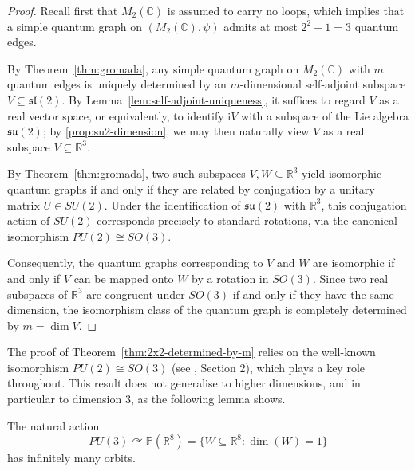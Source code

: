 \begin{proof}
    \label{prf:1x2-determined-by-m}
    Recall first that \( M_2(\mathbb{C}) \) is assumed to carry
    no loops, which implies that a simple quantum graph on
    \( (M_2(\mathbb{C}), \psi) \) admits at most \( 2^2 - 1 = 3 \)
    quantum edges.

    By Theorem~\ref{thm:gromada}, any simple quantum graph on
    \( M_2(\mathbb{C}) \) with \( m \) quantum edges is uniquely
    determined by an \( m \)-dimensional self-adjoint subspace
    \( V \subseteq \mathfrak{sl}(2) \). By
    Lemma~\ref{lem:self-adjoint-uniqueness}, it suffices to regard
    \( V \) as a real vector space, or equivalently, to identify
    \( \mathrm{i} V \) with a subspace of the Lie algebra
    \( \mathfrak{su}(2) \); by \ref{prop:su2-dimension}, we may then
    naturally view \( V \) as a real
    subspace \( V \subseteq \mathbb{R}^3 \).

    By Theorem~\ref{thm:gromada}, two such subspaces
    \( V, W \subseteq \mathbb{R}^3 \) yield isomorphic quantum graphs if
    and only if they are related by conjugation by a unitary matrix
    \( U \in SU(2) \). Under the identification of
    \( \mathfrak{su}(2) \) with \( \mathbb{R}^3 \), this conjugation
    action of \( SU(2) \) corresponds precisely to standard rotations,
    via the canonical isomorphism \( PU(2) \cong SO(3) \).

    Consequently, the quantum graphs corresponding to \( V \) and
    \( W \) are isomorphic if and only if \( V \) can be mapped onto
    \( W \) by a rotation in \( SO(3) \). Since two real subspaces of
    \( \mathbb{R}^3 \) are congruent under \( SO(3) \) if and only if
    they have the same dimension, the isomorphism class of the
    quantum graph is completely determined by \( m = \dim V \).
\end{proof}

The proof of Theorem~\ref{thm:2x2-determined-by-m} relies on the
well-known isomorphism \( PU(2) \cong SO(3) \) (see
\textcite{cenci10}, Section 2), which plays a key
role throughout. This result does not generalise to higher
dimensions, and in particular to dimension 3, as the following lemma shows.

\begin{lemma}
    \label{lemma:hard-action}
    The natural action
    \[
        PU(3) \curvearrowright \mathbb{P}(\mathbb{R}^8)
        = \{ W \subseteq \mathbb{R}^8 : \dim(W) = 1 \}
    \]
    has infinitely many orbits.
\end{lemma}

